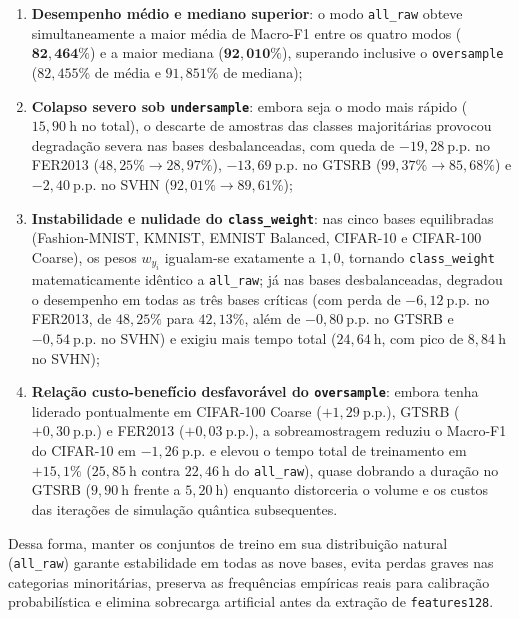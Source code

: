 \documentclass[
    12pt,
    openright,
    oneside,
    a4paper,
    english,
    brazil
]{abntex2}
\begin{document}
\begin{enumerate}
    \item \textbf{Desempenho médio e mediano superior}: o modo \texttt{all\_raw} obteve simultaneamente a maior média de Macro-F1 entre os quatro modos (\(\mathbf{82{,}464\%}\)) e a maior mediana (\(\mathbf{92{,}010\%}\)), superando inclusive o \texttt{oversample} (\(82{,}455\%\) de média e \(91{,}851\%\) de mediana);
    \item \textbf{Colapso severo sob \texttt{undersample}}: embora seja o modo mais rápido (\(15{,}90~\text{h}\) no total), o descarte de amostras das classes majoritárias provocou degradação severa nas bases desbalanceadas, com queda de \(-19{,}28~\text{p.p.}\) no FER2013 (\(48{,}25\% \rightarrow 28{,}97\%\)), \(-13{,}69~\text{p.p.}\) no GTSRB (\(99{,}37\% \rightarrow 85{,}68\%\)) e \(-2{,}40~\text{p.p.}\) no SVHN (\(92{,}01\% \rightarrow 89{,}61\%\));
    \item \textbf{Instabilidade e nulidade do \texttt{class\_weight}}: nas cinco bases equilibradas (Fashion-MNIST, KMNIST, EMNIST Balanced, CIFAR-10 e CIFAR-100 Coarse), os pesos \(w_{y_i}\) igualam-se exatamente a \(1{,}0\), tornando \texttt{class\_weight} matematicamente idêntico a \texttt{all\_raw}; já nas bases desbalanceadas, degradou o desempenho em todas as três bases críticas (com perda de \(-6{,}12~\text{p.p.}\) no FER2013, de \(48{,}25\%\) para \(42{,}13\%\), além de \(-0{,}80~\text{p.p.}\) no GTSRB e \(-0{,}54~\text{p.p.}\) no SVHN) e exigiu mais tempo total (\(24{,}64~\text{h}\), com pico de \(8{,}84~\text{h}\) no SVHN);
    \item \textbf{Relação custo-benefício desfavorável do \texttt{oversample}}: embora tenha liderado pontualmente em CIFAR-100 Coarse (\(+1{,}29~\text{p.p.}\)), GTSRB (\(+0{,}30~\text{p.p.}\)) e FER2013 (\(+0{,}03~\text{p.p.}\)), a sobreamostragem reduziu o Macro-F1 do CIFAR-10 em \(-1{,}26~\text{p.p.}\) e elevou o tempo total de treinamento em \(+15{,}1\%\) (\(25{,}85~\text{h}\) contra \(22{,}46~\text{h}\) do \texttt{all\_raw}), quase dobrando a duração no GTSRB (\(9{,}90~\text{h}\) frente a \(5{,}20~\text{h}\)) enquanto distorceria o volume e os custos das iterações de simulação quântica subsequentes.
\end{enumerate}

Dessa forma, manter os conjuntos de treino em sua distribuição natural (\texttt{all\_raw}) garante estabilidade em todas as nove bases, evita perdas graves nas categorias minoritárias, preserva as frequências empíricas reais para calibração probabilística e elimina sobrecarga artificial antes da extração de \texttt{features128}.
\end{document}
